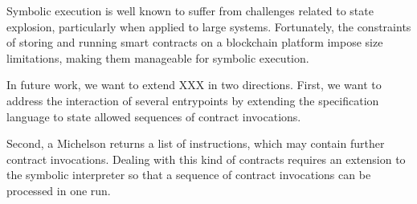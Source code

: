 \documentclass[a4paper,USenglish,cleveref, autoref, thm-restate]{lipics-v2021}
\begin{document}
Symbolic execution is well known to suffer from challenges related to
state explosion, particularly when applied to large
systems. Fortunately, the constraints of storing and running smart
contracts on a blockchain platform impose size limitations, making
them manageable for symbolic execution. 

In future work, we want to extend XXX in two directions. 
First, we want to address the interaction of several entrypoints by
extending the specification language to state allowed sequences of
contract invocations. 

Second, a Michelson returns a list of instructions, which may contain
further contract invocations. Dealing with this kind of contracts
requires an extension to the symbolic interpreter so that a sequence
of contract invocations can be processed in one run.


\end{document}
